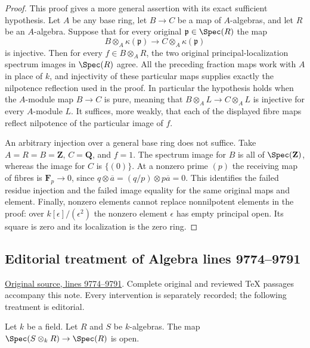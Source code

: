 \begin{proof}
\medskip\noindent
This proof gives a more general assertion with its
exact sufficient hypothesis. Let $A$ be any base
ring, let $B\to C$ be a map of $A$-algebras, and
let $R$ be an $A$-algebra. Suppose that for every
original $\mathfrak p\in\Spec(R)$ the map
$$
B\otimes_A\kappa(\mathfrak p)
\longrightarrow C\otimes_A\kappa(\mathfrak p)
$$
is injective. Then for every $f\in B\otimes_AR$,
the two original principal-localization spectrum
images in $\Spec(R)$ agree. All the preceding
fraction maps work with $A$ in place of $k$,
and injectivity of these particular maps supplies
exactly the nilpotence reflection used in the proof.
In particular the hypothesis holds when the
$A$-module map $B\to C$ is pure, meaning that
$B\otimes_AL\to C\otimes_AL$ is injective for
every $A$-module $L$. It suffices, more weakly,
that each of the displayed fibre maps reflect
nilpotence of the particular image of $f$.

An arbitrary injection over a general base ring
does not suffice. Take $A=R=B=\mathbf Z$,
$C=\mathbf Q$, and $f=1$. The spectrum image
for $B$ is all of $\Spec(\mathbf Z)$, whereas
the image for $C$ is $\{(0)\}$. At a nonzero
prime $(p)$ the receiving map of fibres is
$\mathbf F_p\to0$, since
$q\otimes\overline a=(q/p)\otimes p\overline a=0$.
This identifies the failed residue injection and
the failed image equality for the same original
maps and element. Finally, nonzero elements cannot
replace nonnilpotent elements in the proof: over
$k[\epsilon]/(\epsilon^2)$ the nonzero element
$\epsilon$ has empty principal open. Its square
is zero and its localization is the zero ring.
\end{proof}


\subsection{Editorial treatment of Algebra lines 9774--9791}

\hypertarget{algebra-context-113}{}

\noindent\href{https://github.com/stacks/stacks-project/blob/a04446e57ec1fbc252a871afcec7752fb2807b14/algebra.tex\#L9774}{Original source, lines 9774--9791}. Complete original and reviewed TeX passages accompany this note. Every intervention is separately recorded; the following treatment is editorial.


\begin{lemma}
\label{editorial-source-lemma-map-into-tensor-algebra-open}
Let $k$ be a field.
Let $R$ and $S$ be $k$-algebras.
The map $\Spec(S \otimes_k R) \to \Spec(R)$
is open.
\end{lemma}

